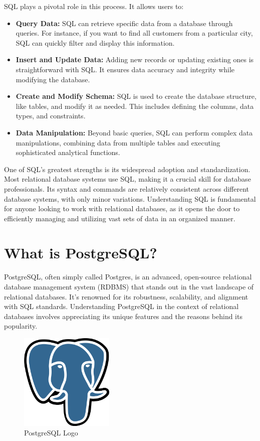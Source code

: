 SQL plays a pivotal role in this process. It allows users to:

\begin{itemize}
\item \textbf{Query Data:} SQL can retrieve specific data from a database through queries. For instance, if you want to find all customers from a particular city, SQL can quickly filter and display this information.
\item \textbf{Insert and Update Data:} Adding new records or updating existing ones is straightforward with SQL. It ensures data accuracy and integrity while modifying the database.
\item \textbf{Create and Modify Schema:} SQL is used to create the database structure, like tables, and modify it as needed. This includes defining the columns, data types, and constraints.
\item \textbf{Data Manipulation:} Beyond basic queries, SQL can perform complex data manipulations, combining data from multiple tables and executing sophisticated analytical functions.
\end{itemize}

One of SQL's greatest strengths is its widespread adoption and standardization. Most relational database systems use SQL, making it a crucial skill for database professionals. Its syntax and commands are relatively consistent across different database systems, with only minor variations. Understanding SQL is fundamental for anyone looking to work with relational databases, as it opens the door to efficiently managing and utilizing vast sets of data in an organized manner.

\section{What is PostgreSQL?}
PostgreSQL, often simply called Postgres, is an advanced, open-source relational database management system (RDBMS) that stands out in the vast landscape of relational databases. It's renowned for its robustness, scalability, and alignment with SQL standards. Understanding PostgreSQL in the context of relational databases involves appreciating its unique features and the reasons behind its popularity.

\begin{figure}[h]
    \centering
    \includegraphics[width=0.4\textwidth]{content/1-relational-databases/figures/PostgreSQL_logo.3colors.540x557.png}
    \caption{PostgreSQL Logo}
    \label{fig:PostgreSQL_logo.3colors.540x557.png}
\end{figure}

